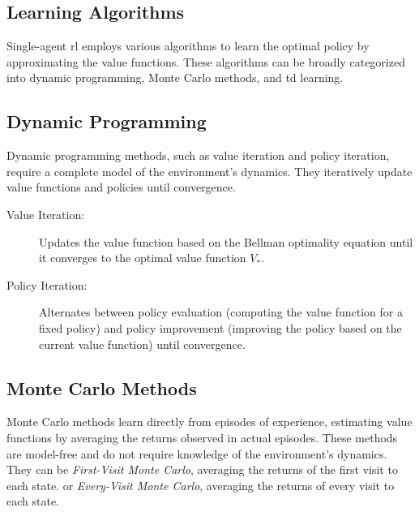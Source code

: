 \subsection*{Learning Algorithms}
Single-agent \gls{rl} employs various algorithms to learn the optimal policy by approximating 
the value functions. These algorithms can be broadly categorized into dynamic programming, 
Monte Carlo methods, and \gls{td} learning.

\subsection*{Dynamic Programming}
Dynamic programming methods, such as value iteration and policy iteration, 
require a complete model of the environment's dynamics. 
They iteratively update value functions and policies until convergence.
\begin{description}
    \item[Value Iteration:] Updates the value function based on the Bellman optimality equation 
        until it converges to the optimal value function \(V_*\).
    \item[Policy Iteration:] Alternates between policy evaluation 
        (computing the value function for a fixed policy) and policy improvement 
        (improving the policy based on the current value function) until convergence.
\end{description}

\subsection*{Monte Carlo Methods}
Monte Carlo methods learn directly from episodes of experience, 
estimating value functions by averaging the returns observed in actual episodes. 
These methods are model-free and do not require knowledge of the environment's dynamics. 
They can be \emph{First-Visit Monte Carlo}, averaging the returns of the first visit to each state.
or \emph{Every-Visit Monte Carlo}, averaging the returns of every visit to each state.

